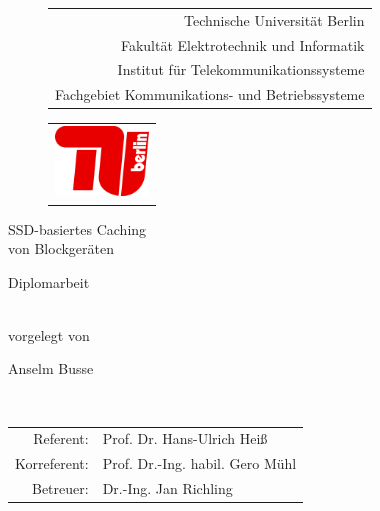 \begin{titlepage} \titleFont
	\begin{figure} \titleFont
		\begin{flushright}
			\begin{tabular}[m]{r}
				Technische Universität Berlin \\
				Fakultät Elektrotechnik und Informatik \\
				Institut für Telekommunikationssysteme \\
				Fachgebiet Kommunikations- und Betriebssysteme \\
			\end{tabular}%
			\begin{tabular}[m]{c}
				\includegraphics[width=2.5cm]{figures/tu-logo}
			\end{tabular}
		\end{flushright}
	\end{figure}
	
	\begin{center}
		\rule{0pt}{0pt}
		\vfill
		\vfill
		\vfill
		
		\begin{Huge} \titleFontBold
			SSD-basiertes Caching\\[0.75ex]
			von Blockgeräten\\[0.75ex]
		\end{Huge}
		
		\vfill
		\vfill
		
		\begin{huge} \titleFontBold
			Diplomarbeit
		\end{huge} \\
		\vspace{.5cm}
		vorgelegt von \\
		\vspace{.5cm}
		\begin{Large} \titleFontBold
			Anselm Busse
		\end{Large} \\ \vspace{.5cm}
		
		\vfill
		\vfill
		\vfill
		\vfill
		\vfill
		
		\begin{tabular}{rl}
			Referent:    & Prof. Dr. Hans-Ulrich Heiß\\
			Korreferent: & Prof. Dr.-Ing. habil. Gero Mühl\\
			Betreuer:    & Dr.-Ing. Jan Richling\\
		\end{tabular}
	\end{center}
\end{titlepage}
\textFont

\thispagestyle{empty}
